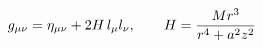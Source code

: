 \documentclass[preview]{standalone}
\begin{document}
\begin{align*}
\special{dvisvgm:raw <g id='unique000'>}g_{\mu\nu} = \eta_{\mu\nu} + 2H\,l_\mu l_\nu,\qquad H = \frac{Mr^3}{r^4+a^2z^2}\special{dvisvgm:raw </g>}
\end{align*}
\end{document}

